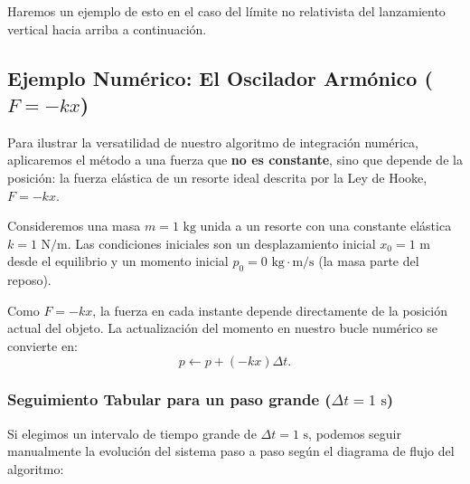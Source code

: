 \documentclass[11pt,a4paper]{book}
\begin{document}
Haremos un ejemplo de esto en el caso del límite no relativista del lanzamiento vertical hacia arriba a continuación.

\subsection{Ejemplo Numérico: El Oscilador Armónico ($F = -kx$)}

Para ilustrar la versatilidad de nuestro algoritmo de integración numérica, aplicaremos el método a una fuerza que \textbf{no es constante}, sino que depende de la posición: la fuerza elástica de un resorte ideal descrita por la Ley de Hooke, $F = -kx$. 

Consideremos una masa $m = 1 \text{ kg}$ unida a un resorte con una constante elástica $k = 1 \text{ N/m}$. Las condiciones iniciales son un desplazamiento inicial $x_0 = 1 \text{ m}$ desde el equilibrio y un momento inicial $p_0 = 0 \text{ kg}\cdot\text{m/s}$ (la masa parte del reposo). 

Como $F = -kx$, la fuerza en cada instante depende directamente de la posición actual del objeto. La actualización del momento en nuestro bucle numérico se convierte en:
\begin{equation}
    p \leftarrow p + (-kx)\Delta t.
\end{equation}

\subsubsection{Seguimiento Tabular para un paso grande ($\Delta t = 1\text{ s}$)}

Si elegimos un intervalo de tiempo grande de $\Delta t = 1 \text{ s}$, podemos seguir manualmente la evolución del sistema paso a paso según el diagrama de flujo del algoritmo:
\end{document}

